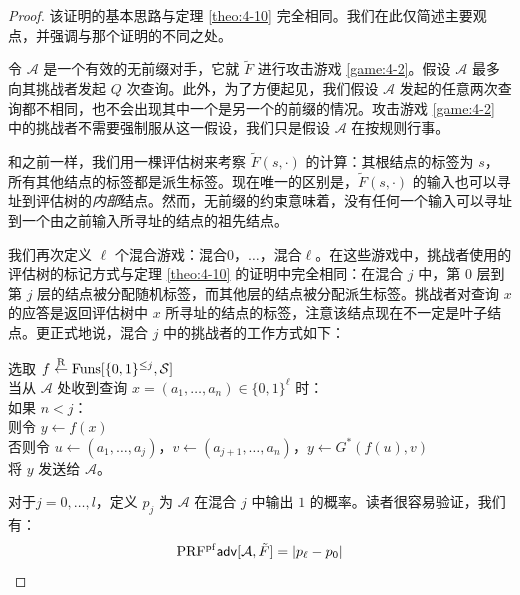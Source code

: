 \begin{proof}
该证明的基本思路与定理 \ref{theo:4-10} 完全相同。我们在此仅简述主要观点，并强调与那个证明的不同之处。

令 $\mathcal{A}$ 是一个有效的无前缀对手，它就 $\tilde F$ 进行攻击游戏 \ref{game:4-2}。假设 $\mathcal{A}$ 最多向其挑战者发起 $Q$ 次查询。此外，为了方便起见，我们假设 $\mathcal{A}$ 发起的任意两次查询都不相同，也不会出现其中一个是另一个的前缀的情况。攻击游戏 \ref{game:4-2} 中的挑战者不需要强制服从这一假设，我们只是假设 $\mathcal{A}$ 在按规则行事。

和之前一样，我们用一棵评估树来考察 $\tilde F(s,\cdot)$ 的计算：其根结点的标签为 $s$，所有其他结点的标签都是派生标签。现在唯一的区别是，$\tilde F(s,\cdot)$ 的输入也可以寻址到评估树的\emph{内部}结点。然而，无前缀的约束意味着，没有任何一个输入可以寻址到一个由之前输入所寻址的结点的祖先结点。

我们再次定义 $\ell$ 个混合游戏：混合$0$，$\dots$，混合$\ell$。在这些游戏中，挑战者使用的评估树的标记方式与定理 \ref{theo:4-10} 的证明中完全相同：在混合 $j$ 中，第 $0$ 层到第 $j$ 层的结点被分配随机标签，而其他层的结点被分配派生标签。挑战者对查询 $x$ 的应答是返回评估树中 $x$ 所寻址的结点的标签，注意该结点现在不一定是叶子结点。更正式地说，混合 $j$ 中的挑战者的工作方式如下：

\vspace{5pt}

\hspace*{5pt} 选取 $f\overset{\rm R}\leftarrow{\rm Funs}[\{0,1\}^{\leq j},\mathcal{S}]$\\
\hspace*{26pt} 当从 $\mathcal{A}$ 处收到查询 $x=(a_1,\dots,a_n)\in\{0,1\}^\ell$ 时：\\
\hspace*{50pt} 如果 $n<j$：\\
\hspace*{75pt} 则令 $y\leftarrow f(x)$\\
\hspace*{75pt} 否则令 $u\leftarrow(a_1,\dots,a_j)$，$v\leftarrow(a_{j+1},\dots,a_n)$，$y\leftarrow G^*(f(u),v)$\\
\hspace*{50pt} 将 $y$ 发送给 $\mathcal{A}$。

\vspace{5pt}

\noindent
对于$j=0,\dots,l$，定义 $p_j$ 为 $\mathcal{A}$ 在混合 $j$ 中输出 $1$ 的概率。读者很容易验证，我们有：
\[
{\rm PRF^{pf}\mathsf{adv}}[\mathcal{A},\tilde{F}]=|p_\ell-p_0|
\]


\end{proof}
